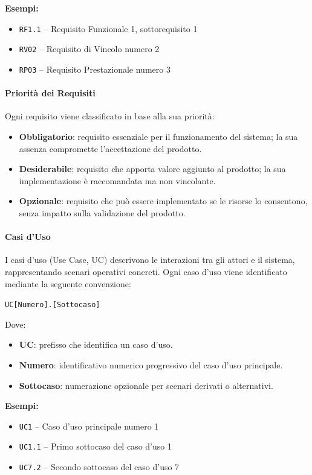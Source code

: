 \documentclass[a4paper, 11pt, oneside]{scrartcl} %
\begin{document}
\noindent
\textbf{Esempi:}
\begin{itemize}
    \item \texttt{RF1.1} – Requisito Funzionale 1, sottorequisito 1
    \item \texttt{RV02} – Requisito di Vincolo numero 2
    \item \texttt{RP03} – Requisito Prestazionale numero 3
\end{itemize}

\paragraph{Priorità dei Requisiti}
Ogni requisito viene classificato in base alla sua priorità:
\begin{itemize}
    \item \textbf{Obbligatorio}: requisito essenziale per il funzionamento del sistema; la sua assenza compromette l'accettazione del prodotto.
    \item \textbf{Desiderabile}: requisito che apporta valore aggiunto al prodotto; la sua implementazione è raccomandata ma non vincolante.
    \item \textbf{Opzionale}: requisito che può essere implementato se le risorse lo consentono, senza impatto sulla validazione del prodotto.
\end{itemize}

\paragraph{Casi d'Uso}
I casi d'uso (Use Case, UC) descrivono le interazioni tra gli attori e il sistema, rappresentando scenari operativi concreti.
Ogni caso d'uso viene identificato mediante la seguente convenzione:

\begin{center}
\texttt{UC[Numero].[Sottocaso]}
\end{center}

\noindent
Dove:
\begin{itemize}
    \item \textbf{UC}: prefisso che identifica un caso d'uso.
    \item \textbf{Numero}: identificativo numerico progressivo del caso d'uso principale.
    \item \textbf{Sottocaso}: numerazione opzionale per scenari derivati o alternativi.
\end{itemize}

\noindent
\textbf{Esempi:}
\begin{itemize}
    \item \texttt{UC1} – Caso d'uso principale numero 1
    \item \texttt{UC1.1} – Primo sottocaso del caso d'uso 1
    \item \texttt{UC7.2} – Secondo sottocaso del caso d'uso 7
\end{itemize}
\end{document}
